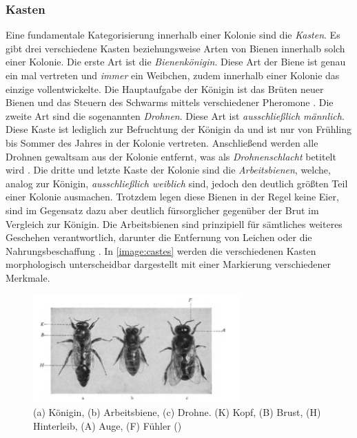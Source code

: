 \subsubsection{Kasten}
Eine fundamentale Kategorisierung innerhalb einer Kolonie sind die \textit{Kasten}. Es gibt drei verschiedene Kasten beziehungsweise Arten von Bienen innerhalb solch einer Kolonie. Die erste Art ist die \textit{Bienenkönigin}. Diese Art der Biene ist genau ein mal vertreten und \textit{immer} ein Weibchen, zudem innerhalb einer Kolonie das einzige vollentwickelte. Die Hauptaufgabe der Königin ist das Brüten neuer Bienen und das Steuern des Schwarms mittels verschiedener Pheromone \cite*[]{bees:queen}. Die zweite Art sind die sogenannten \textit{Drohnen}. Diese Art ist \textit{ausschließlich männlich}. Diese Kaste ist lediglich zur Befruchtung der Königin da und ist nur von Frühling bis Sommer des Jahres in der Kolonie vertreten. Anschließend werden alle Drohnen gewaltsam aus der Kolonie entfernt, was als \textit{Drohnenschlacht} betitelt wird \cite*[]{bees:sex}. Die dritte und letzte Kaste der Kolonie sind die \textit{Arbeitsbienen}, welche, analog zur Königin, \textit{ausschließlich weiblich} sind, jedoch den deutlich größten Teil einer Kolonie ausmachen. Trotzdem legen diese Bienen in der Regel keine Eier, sind im Gegensatz dazu aber deutlich fürsorglicher gegenüber der Brut im Vergleich zur Königin. Die Arbeitsbienen sind prinzipiell für sämtliches weiteres Geschehen verantwortlich, darunter die Entfernung von Leichen oder die Nahrungsbeschaffung \cite*[S.2-3]{bees:frisch}. In \autoref{image:castes} werden die verschiedenen Kasten morphologisch unterscheidbar dargestellt mit einer Markierung verschiedener Merkmale. 

\begin{figure}
    \begin{center}
        \includegraphics[width=300px]{0.bilder/castes.png}
    \end{center}
    \caption{(a) Königin, (b) Arbeitsbiene, (c) Drohne. (K) Kopf, (B) Brust, (H) Hinterleib, (A) Auge, (F) Fühler (\cite[S.2]{bees:frisch})} \label{image:castes}
\end{figure}



